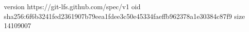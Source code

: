 version https://git-lfs.github.com/spec/v1
oid sha256:6f6b3241fed2361907b79eea1fdee3c50e45334faeffb962378a1e30384c87f9
size 14109007
